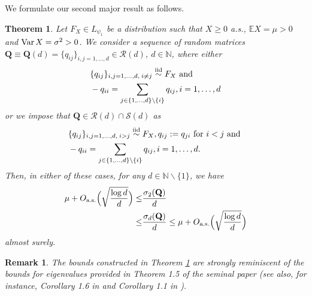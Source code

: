 \documentclass[9pt,twocolumn,twoside]{pnas-new}
\makeatletter
\newcommand{\bbN}{{\mathbb N}}
\newcommand{\bbE}{{\mathbb E}}
\newcommand{\Var}{\textnormal{Var\hspace{0.5mm}}}
\newcommand{\?}{\textbf{?}}
\newcommand{\as}{\textnormal{a.s.}}
\newcommand{\QQ}{\mathbf{Q}}
\newtheorem{@remark}{\bf Remark}
\newenvironment{remark}{\begin{@remark}\rm}{\end{@remark}}
\newtheorem{theorem}{\bf Theorem}
\makeatother
\begin{document}
We formulate our second major result as follows. 
\begin{theorem}\label{t:lambda_n-1(Q)->-infty_non-symm_a.s.}
  Let $F_X \in L_{\psi_1}$ be a distribution such that $X \geq 0$
  a.s., $\bbE X = \mu > 0$ and $\Var X = \sigma^2 > 0$. We consider a
  sequence of random matrices
  $\QQ \equiv \QQ(d) = \{q_{ij}\}_{i,j=1,\hdots,d} \in \mathcal{R}(d)$, $d \in \bbN$,
  where either
  \begin{align}\label{e:RM_theorem_general_condition}
    \begin{aligned}
  &\{q_{ij}\}_{i , j =1, \hdots, d, \hspace{0.75mm}i \neq j}
    \stackrel{\textnormal{iid}}\sim F_X
    \text{ and }\\
  &- q_{ii} = \sum_{j \in \{1,\hdots,d\} \backslash \{i\}}q_{ij},
  i=1,\hdots,d
  \end{aligned}
  \end{align}
  or we impose that $\QQ \in \mathcal{R}(d) \cap \mathcal{S}(d)$ as 
    \begin{align}
    \begin{aligned}\label{e:RM_theorem_symmetry_condition}
  &\{q_{ij}\}_{i , j =1, \hdots, d, \hspace{0.75mm}i > j}
  \stackrel{\textnormal{iid}}\sim F_X,
  q_{ij} := q_{ji} \text{ for } i < j
    \text{ and }\\
  &- q_{ii} = \sum_{j \in \{1,\hdots,d\} \backslash \{i\}}q_{ij},
  i=1,\hdots,d.
  \end{aligned}
\end{align}
    Then, in either of these cases, for any $d \in \bbN \backslash\{1\}$, we have
    \begin{align}
 \mu+ O_{\as}\Big(\sqrt{ \frac{\log d}{d}}\Big) \leq& \frac{\sigma_2(\QQ)}{d} 
 \notag \\
 \leq& \frac{\sigma_d(\QQ)}{d}
 \leq \mu+ O_{\as}\Big(\sqrt{ \frac{\log d}{d}}\Big)
 \label{e:lambda_n-1(Q)->-infty_non-symm}
      \end{align}
      almost surely. %
\end{theorem}

\begin{remark}
  The bounds constructed in Theorem
  \ref{t:lambda_n-1(Q)->-infty_non-symm_a.s.} are strongly reminiscent
  of the bounds for eigenvalues provided in Theorem 1.5 of the seminal
  paper \cite{bordenave:caputo:chafai:2014} (see also, for instance,
  Corollary 1.6 in \cite{bryc:dembo:jiang:2006} and Corollary 1.1 in
  \cite{ding:jiang:2010}).
\end{remark}
\end{document}
